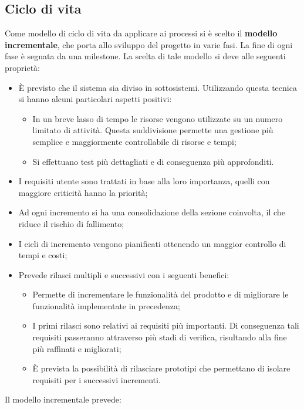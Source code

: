 \subsection{Ciclo di vita}
Come modello di ciclo di vita da applicare ai processi si è scelto il \textbf{modello incrementale}, che porta allo sviluppo del progetto in varie fasi. La fine di ogni fase è segnata da una milestone.
La scelta di tale modello si deve alle seguenti proprietà:
\begin{itemize}
	\item È previsto che il sistema sia diviso in sottosistemi. Utilizzando questa tecnica si hanno alcuni particolari aspetti positivi:
	\begin{itemize}
		\item In un breve lasso di tempo le risorse vengono utilizzate su un numero limitato di attività. Questa suddivisione permette una gestione più semplice e maggiormente controllabile di risorse e tempi;
		\item Si effettuano test più dettagliati e di conseguenza più approfonditi.
	\end{itemize}
	\item I requisiti utente sono trattati in base alla loro importanza, quelli con maggiore criticità hanno la priorità;
	\item Ad ogni incremento si ha una consolidazione della sezione coinvolta, il che riduce il rischio di fallimento;
	\item I cicli di incremento vengono pianificati ottenendo un maggior controllo di tempi e costi;
	\item Prevede rilasci multipli e successivi con i seguenti benefici:
	\begin{itemize}
		\item Permette di incrementare le funzionalità del prodotto e di migliorare le funzionalità implementate in precedenza;
		\item I primi rilasci sono relativi ai requisiti più importanti. Di conseguenza tali requisiti passeranno attraverso più stadi di verifica, risultando alla fine più raffinati e migliorati;
		\item È prevista la possibilità di rilasciare prototipi che permettano di isolare requisiti per i successivi incrementi.
	\end{itemize}
\end{itemize}
Il modello incrementale prevede:
